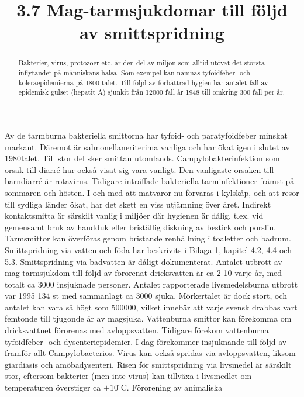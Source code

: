 \title{
3.7 Mag-tarmsjukdomar till följd av smittspridning
}
\begin{abstract}
Bakterier, virus, protozoer etc. är den del av miljön som alltid utövat det största inflytandet på människans hälsa. Som exempel kan nämnas tyfoidfeber- och koleraepidemierna på 1800-talet. Till följd av förbättrad hygien har antalet fall av epidemisk gulset (hepatit A) sjunkit från 12000 fall år 1948 till omkring 300 fall per år.
\end{abstract}
Av de tarmburna bakteriella smittorna har tyfoid- och paratyfoidfeber minskat markant. Däremot är salmonellaneriterima vanliga och har ökat igen i slutet av 1980talet. Till stor del sker smittan utomlands. Campylobakterinfektion som orsak till diarré har också visat sig vara vanligt. Den vanligaste orsaken till barndiarré är rotavirus.
Tidigare inträffade bakteriella tarminfektioner främst på sommaren och hösten. I och med att matvaror nu förvaras i kylskåp, och att resor till sydliga länder ökat, har det skett en viss utjämning över året. Indirekt kontaktsmitta är särskilt vanlig i miljöer där hygienen är dålig, t.ex. vid gemensamt bruk av handduk eller briställig diskning av bestick och porslin. Tarmsmittor kan överföras genom bristande renhållning i toaletter och badrum.
Smittspridning via vatten och föda har beskrivits i Bilaga 1, kapitel 4.2, 4.4 och 5.3. Smittspridning via badvatten är dåligt dokumenterat. Antalet utbrott av mag-tarmsjukdom till följd av förorenat dricksvatten är ca 2-10 varje år, med totalt ca 3000 insjuknade personer. Antalet rapporterade livsmedelsburna utbrott var 1995 134 st med sammanlagt ca 3000 sjuka. Mörkertalet är dock stort, och antalet kan vara så högt som 500000, vilket innebär att varje svensk drabbas vart femtonde till tjugonde år av magsjuka.
Vattenburna smittor kan förekomma om dricksvattnet förorenas med avloppsvatten. Tidigare förekom vattenburna tyfoidfeber- och dysenteriepidemier. I dag förekommer insjuknande till följd av framför allt Campylobacterios. Virus kan också spridas via avloppsvatten, liksom giardiasis och amöbadysenteri.
Risen för smittspridning via livsmedel är särskilt stor, eftersom bakterier (men inte virus) kan tillväxa i livsmedlet om temperaturen överstiger ca \(+10^{\circ} \mathrm{C}\). Förorening av animaliska


